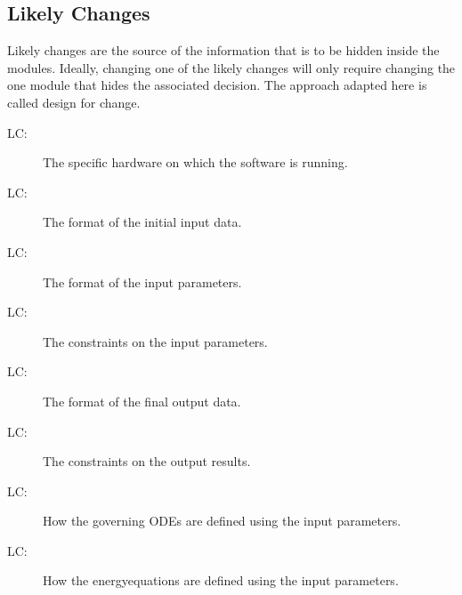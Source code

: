 \documentclass[12pt]{article}
\newcounter{lcnum}
\newcommand{\lcthelcnum}{LC\thelcnum}
\begin{document}
\subsection{Likely Changes}
\label{Sec:LikeChan}
Likely changes are the source of the information that is to be hidden inside the modules. Ideally, changing one of the likely changes will only require changing the one module that hides the associated decision. The approach adapted here is called design for change.
\begin{description}
\item[\lcthelcnum\label{LC:hardware}:]The specific hardware on which the software is running.
\end{description}
\begin{description}
\item[\lcthelcnum\label{LC:input}:]The format of the initial input data.
\end{description}
\begin{description}
\item[\lcthelcnum\label{LC:parameters}:]The format of the input parameters.
\end{description}
\begin{description}
\item[\lcthelcnum\label{LC:inputverification}:]The constraints on the input parameters.
\end{description}
\begin{description}
\item[\lcthelcnum\label{LC:output}:]The format of the final output data.
\end{description}
\begin{description}
\item[\lcthelcnum\label{LC:outputverification}:]The constraints on the output results.
\end{description}
\begin{description}
\item[\lcthelcnum\label{LC:temp}:]How the governing ODEs are defined using the input parameters.
\end{description}
\begin{description}
\item[\lcthelcnum\label{LC:energy}:]How the energyequations are defined using the input parameters.
\end{description}
\end{document}
